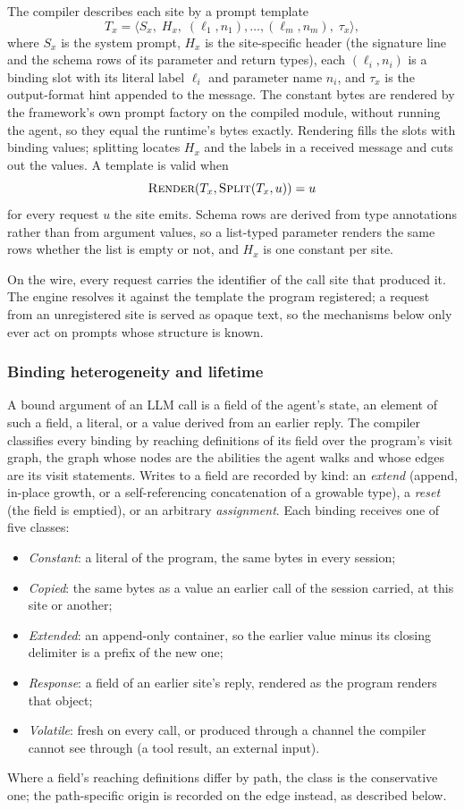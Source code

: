 The compiler describes each site by a prompt template
\[
T_x=\langle S_x,\;H_x,\;(\ell_1,n_1),\ldots,(\ell_m,n_m),\;\tau_x\rangle,
\]
where $S_x$ is the system prompt, $H_x$ is the site-specific header (the signature line and the schema rows of its parameter and return types), each $(\ell_i,n_i)$ is a binding slot with its literal label $\ell_i$ and parameter name $n_i$, and $\tau_x$ is the output-format hint appended to the message. The constant bytes are rendered by the framework's own prompt factory on the compiled module, without running the agent, so they equal the runtime's bytes exactly. Rendering fills the slots with binding values; splitting locates $H_x$ and the labels in a received message and cuts out the values. A template is valid when
\[
\textsc{Render}(T_x,\textsc{Split}(T_x,u))=u
\]
for every request $u$ the site emits. Schema rows are derived from type annotations rather than from argument values, so a list-typed parameter renders the same rows whether the list is empty or not, and $H_x$ is one constant per site.

On the wire, every request carries the identifier of the call site that produced it. The engine resolves it against the template the program registered; a request from an unregistered site is served as opaque text, so the mechanisms below only ever act on prompts whose structure is known.

\subsubsection{Binding heterogeneity and lifetime}
\label{subsubsec:bindings}
A bound argument of an LLM call is a field of the agent's state, an element of such a field, a literal, or a value derived from an earlier reply. The compiler classifies every binding by reaching definitions of its field over the program's visit graph, the graph whose nodes are the abilities the agent walks and whose edges are its visit statements. Writes to a field are recorded by kind: an \emph{extend} (append, in-place growth, or a self-referencing concatenation of a growable type), a \emph{reset} (the field is emptied), or an arbitrary \emph{assignment}. Each binding receives one of five classes:
\begin{itemize}
\item \emph{Constant}: a literal of the program, the same bytes in every session;
\item \emph{Copied}: the same bytes as a value an earlier call of the session carried, at this site or another;
\item \emph{Extended}: an append-only container, so the earlier value minus its closing delimiter is a prefix of the new one;
\item \emph{Response}: a field of an earlier site's reply, rendered as the program renders that object;
\item \emph{Volatile}: fresh on every call, or produced through a channel the compiler cannot see through (a tool result, an external input).
\end{itemize}
Where a field's reaching definitions differ by path, the class is the conservative one; the path-specific origin is recorded on the edge instead, as described below.

